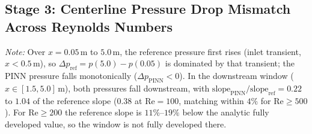 \documentclass[11pt,a4paper]{article}
\begin{document}
\subsection{Stage 3: Centerline Pressure Drop Mismatch Across Reynolds Numbers}
\begin{table}[H]
\centering
\small
{}
\par\vspace{0.4em}\noindent\textit{Note:} Over $x=0.05\,\text{m}$ to $5.0\,\text{m}$, the reference pressure first rises (inlet transient, $x < 0.5\,\text{m}$), so $\Delta p_{\mathrm{ref}} = p(5.0) - p(0.05)$ is dominated by that transient; the PINN pressure falls monotonically ($\Delta p_{\mathrm{PINN}} < 0$). In the downstream window ($x \in [1.5, 5.0]\,\text{m}$), both pressures fall downstream, with $\mathrm{slope}_{\mathrm{PINN}}/\mathrm{slope}_{\mathrm{ref}} = 0.22$ to $1.04$ of the reference slope ($0.38$ at $\mathrm{Re}=100$, matching within $4\%$ for $\mathrm{Re} \ge 500$). For $\mathrm{Re} \ge 200$ the reference slope is $11\%$--$19\%$ below the analytic fully developed value, so the window is not fully developed there.
\caption{Stage 3 centerline pressure development: full-domain difference $\Delta p = p(5.0) - p(0.05)$ and downstream pressure gradients $dp/dx$ in the downstream window ($x \in [1.5, 5.0]\,\text{m}$) along $(y=H/2, z=W/2)$, where $\left.\frac{dp}{dx}\right|_{\mathrm{ana}}$ denotes the analytic fully developed gradient ($f\cdot\mathrm{Re}=62.196$).}
\label{tab:stage3_dp_ratio}
\end{table}
\end{document}
